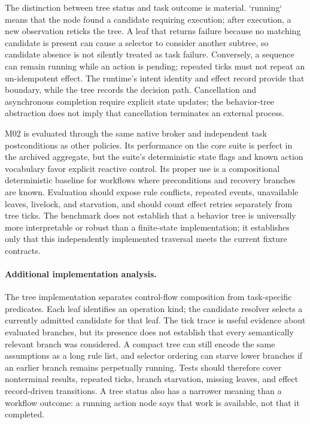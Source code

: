 The distinction between tree status and task outcome is material. `running` means that the node found a candidate requiring execution; after execution, a new observation reticks the tree. A leaf that returns failure because no matching candidate is present can cause a selector to consider another subtree, so candidate absence is not silently treated as task failure. Conversely, a sequence can remain running while an action is pending; repeated ticks must not repeat an un-idempotent effect. The runtime's intent identity and effect record provide that boundary, while the tree records the decision path. Cancellation and asynchronous completion require explicit state updates; the behavior-tree abstraction does not imply that cancellation terminates an external process.

M02 is evaluated through the same native broker and independent task postconditions as other policies. Its performance on the core suite is perfect in the archived aggregate, but the suite's deterministic state flags and known action vocabulary favor explicit reactive control. Its proper use is a compositional deterministic baseline for workflows where preconditions and recovery branches are known. Evaluation should expose rule conflicts, repeated events, unavailable leaves, livelock, and starvation, and should count effect retries separately from tree ticks. The benchmark does not establish that a behavior tree is universally more interpretable or robust than a finite-state implementation; it establishes only that this independently implemented traversal meets the current fixture contracts.



\paragraph{Additional implementation analysis.} The tree implementation separates control-flow composition from task-specific predicates. Each leaf identifies an operation kind; the candidate resolver selects a currently admitted candidate for that leaf. The tick trace is useful evidence about evaluated branches, but its presence does not establish that every semantically relevant branch was considered. A compact tree can still encode the same assumptions as a long rule list, and selector ordering can starve lower branches if an earlier branch remains perpetually running. Tests should therefore cover nonterminal results, repeated ticks, branch starvation, missing leaves, and effect record-driven transitions. A tree status also has a narrower meaning than a workflow outcome: a running action node says that work is available, not that it completed.

